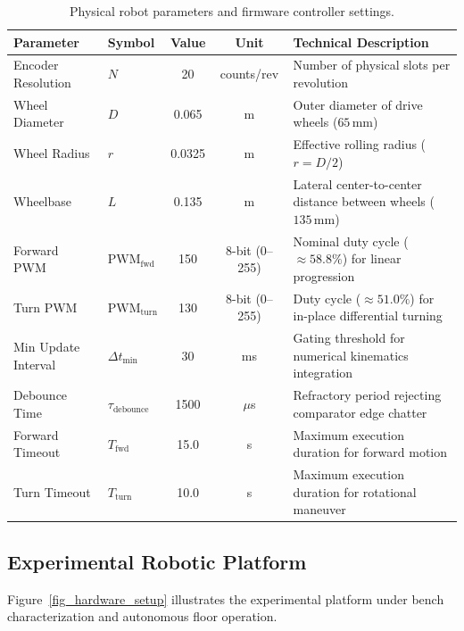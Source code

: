\documentclass[11pt,a4paper]{article}
\begin{document}
\begin{table}[H]
\centering
\small
\renewcommand{\arraystretch}{0.82}
\begin{tabularx}{\textwidth}{@{}llccX@{}}
\toprule
\textbf{Parameter} & \textbf{Symbol} & \textbf{Value} & \textbf{Unit} & \textbf{Technical Description} \\
\midrule
Encoder Resolution & $N$ & 20 & counts/rev & Number of physical slots per revolution \\
Wheel Diameter & $D$ & 0.065 & m & Outer diameter of drive wheels ($65\,\text{mm}$) \\
Wheel Radius & $r$ & 0.0325 & m & Effective rolling radius ($r = D/2$) \\
Wheelbase & $L$ & 0.135 & m & Lateral center-to-center distance between wheels ($135\,\text{mm}$) \\
Forward PWM & $\text{PWM}_{\text{fwd}}$ & 150 & 8-bit (0--255) & Nominal duty cycle ($\approx 58.8\%$) for linear progression \\
Turn PWM & $\text{PWM}_{\text{turn}}$ & 130 & 8-bit (0--255) & Duty cycle ($\approx 51.0\%$) for in-place differential turning \\
Min Update Interval & $\Delta t_{\text{min}}$ & 30 & ms & Gating threshold for numerical kinematics integration \\
Debounce Time & $\tau_{\text{debounce}}$ & 1500 & $\mu$s & Refractory period rejecting comparator edge chatter \\
Forward Timeout & $T_{\text{fwd}}$ & 15.0 & s & Maximum execution duration for forward motion \\
Turn Timeout & $T_{\text{turn}}$ & 10.0 & s & Maximum execution duration for rotational maneuver \\
\bottomrule
\end{tabularx}
\caption{Physical robot parameters and firmware controller settings.}
\label{tab_parameters}
\end{table}

\subsection{Experimental Robotic Platform}
Figure~\ref{fig_hardware_setup} illustrates the experimental platform under bench characterization and autonomous floor operation.
\end{document}
